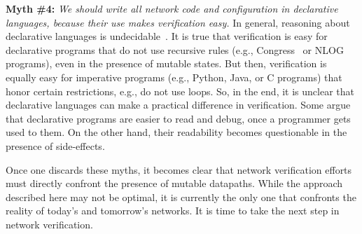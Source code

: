 {\noindent \bf Myth \#4:} \emph{We should write all network code and configuration in declarative languages, because their use makes verification easy.} In general, reasoning about declarative languages is undecidable~\cite{Halevy}. It is true that verification is easy for declarative programs that do not use recursive rules (e.g., Congress~\cite{congress} or NLOG programs), even in the presence of mutable states. But then, verification is equally easy for imperative programs (e.g., Python, Java, or C programs) that honor certain restrictions, e.g., do not use loops. So, in the end, it is unclear that declarative languages can make a practical difference in verification. Some argue that declarative programs are easier to read and debug, once a programmer gets used to them. On the other hand, their readability becomes questionable in the presence of side-effects.


\medskip

Once one discards these myths, it becomes clear that network verification efforts must directly confront the presence of mutable datapaths. While the approach described here may not be optimal, it is currently the only one that confronts the reality of today's and tomorrow's networks. It is time to take the next step in network verification.


